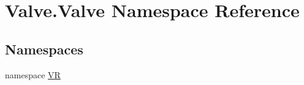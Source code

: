 \hypertarget{namespace_valve_1_1_valve}{}\section{Valve.\+Valve Namespace Reference}
\label{namespace_valve_1_1_valve}
\subsection*{Namespaces}
\begin{DoxyCompactItemize}
\item 
namespace \mbox{\hyperlink{namespace_valve_1_1_valve_1_1_v_r}{VR}}
\end{DoxyCompactItemize}

